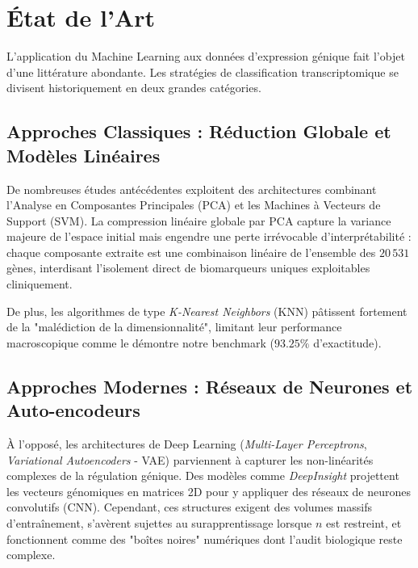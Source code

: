 \documentclass[12pt,a4paper]{report}
\let\oldchapter\chapter
\renewcommand{\chapter}{\clearpage\oldchapter}
\begin{document}
\chapter{\'Etat de l'Art}
L'application du Machine Learning aux donn\'ees d'expression g\'enique fait l'objet d'une litt\'erature abondante. Les strat\'egies de classification transcriptomique se divisent historiquement en deux grandes cat\'egories.

\section{Approches Classiques : R\'eduction Globale et Mod\`eles Lin\'eaires}
De nombreuses \'etudes ant\'ec\'edentes exploitent des architectures combinant l'Analyse en Composantes Principales (PCA) et les Machines \`a Vecteurs de Support (SVM). La compression lin\'eaire globale par PCA capture la variance majeure de l'espace initial mais engendre une perte irr\'evocable d'interpr\'etabilit\'e : chaque composante extraite est une combinaison lin\'eaire de l'ensemble des $20\,531$ g\`enes, interdisant l'isolement direct de biomarqueurs uniques exploitables cliniquement. 

De plus, les algorithmes de type \textit{K-Nearest Neighbors} (KNN) p\^atissent fortement de la "mal\'ediction de la dimensionnalit\'e", limitant leur performance macroscopique comme le d\'emontre notre benchmark ($93.25\%$ d'exactitude).

\section{Approches Modernes : R\'eseaux de Neurones et Auto-encodeurs}
\`A l'oppos\'e, les architectures de Deep Learning (\textit{Multi-Layer Perceptrons}, \textit{Variational Autoencoders} - VAE) parviennent \`a capturer les non-lin\'earit\'es complexes de la r\'egulation g\'enique. Des mod\`eles comme \textit{DeepInsight} projettent les vecteurs g\'enomiques en matrices 2D pour y appliquer des r\'eseaux de neurones convolutifs (CNN). Cependant, ces structures exigent des volumes massifs d'entra\^inement, s'av\`erent sujettes au surapprentissage lorsque $n$ est restreint, et fonctionnent comme des "bo\^ites noires" num\'eriques dont l'audit biologique reste complexe.
\end{document}
